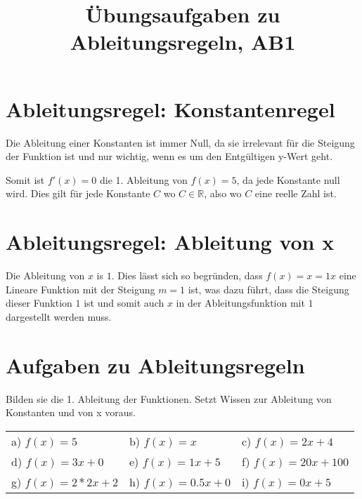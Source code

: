 \documentclass[10pt,a4paper]{article}
\begin{document}
	
\title{Übungsaufgaben zu Ableitungsregeln, AB1}

\makeatletter
\def\@maketitle{%
  \newpage
  \null
  \vskip 2em%
  \begin{center}%
  \let \footnote \thanks
    {\Huge\bfseries\@title \par}%
    \vskip 1.5em%
    {\large
      \lineskip .5em%
      \begin{tabular}[t]{c}%
        \@author
      \end{tabular}\par}%
    \vskip 1em%
    {\large \@date}%
  \end{center}%
  \par
  \vskip 1.5em}
\makeatother

\author{}
\date{}

\maketitle

\section*{Ableitungsregel: Konstantenregel}
Die Ableitung einer Konstanten ist immer Null, da sie irrelevant für die Steigung
der Funktion ist und nur wichtig, wenn es um den Entgültigen y-Wert geht.

Somit ist $f'(x) = 0$ die 1. Ableitung von $f(x) = 5$, da jede Konstante null wird.
Dies gilt für jede Konstante $C$ wo $C  \in \mathbb{R}$, also wo $C$ eine reelle Zahl ist.

\section*{Ableitungsregel: Ableitung von x}
Die Ableitung von $x$ is $1$. Dies lässt sich so begründen, dass $f(x) = x = 1x$
eine Lineare Funktion mit der Steigung $m = 1$ ist, was dazu führt, dass die Steigung dieser
Funktion $1$ ist und somit auch $x$ in der Ableitungsfunktion mit $1$ dargestellt werden muss.

\section*{Aufgaben zu Ableitungsregeln}
Bilden sie die 1. Ableitung der Funktionen. \newline
Setzt Wissen zur Ableitung von Konstanten und von x voraus. \newline

\begin{tabular}{l l l}

	a) $f(x) = 5$        & b) $f(x) = x$        & c) $f(x) = 2x + 4$ \\
	d) $f(x) = 3x + 0$   & e) $f(x) = 1x + 5$   & f) $f(x) = 20x + 100$ \\
	g) $f(x) = 2*2x + 2$ & h) $f(x) = 0.5x + 0$ & i) $f(x) = 0x + 5$

\end{tabular}
\end{document}
